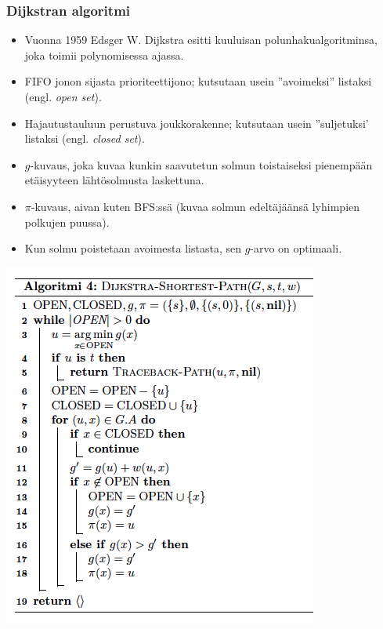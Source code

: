 \documentclass{beamer}
\begin{document}
\begin{frame}
  \frametitle{Dijkstran algoritmi}
  \begin{itemize}
    \item Vuonna 1959 Edsger W. Dijkstra esitti kuuluisan polunhakualgoritminsa, joka toimii polynomisessa ajassa.
    \item FIFO jonon sijasta prioriteettijono; kutsutaan usein ''avoimeksi'' listaksi (engl. \textit{open set}).
    \item Hajautustauluun perustuva joukkorakenne; kutsutaan usein ''suljetuksi' listaksi (engl. \textit{closed set}).
    \item $g$-kuvaus, joka kuvaa kunkin saavutetun solmun toistaiseksi pienempään etäisyyteen lähtösolmusta laskettuna.
    \item $\pi$-kuvaus, aivan kuten BFS:ssä (kuvaa solmun edeltäjäänsä lyhimpien polkujen puussa).
    \item Kun solmu poistetaan avoimesta listasta, sen $g$-arvo on optimaali.
  \end{itemize}
\end{frame}

\begin{frame}
  \includegraphics[width=\textwidth,height=\textheight,keepaspectratio]{dijkstra}
\end{frame}
\end{document}
